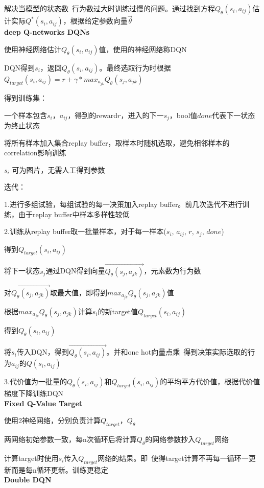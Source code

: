 \documentclass[UTF8]{ctexart}
\begin{document}
  解决当模型的状态数\ 行为数过大时训练过慢的问题。通过找到方程$Q_{\theta}(s_i, a_{ij})$估计实际$Q^*(s_i, a_{ij})$，根据给定参数向量$\vec{\theta}$\\
\textbf{deep Q-networks DQNs}

  使用神经网络估计$Q_{\theta}(s_i, a_{ij})$值，使用的神经网络称DQN
  
  DQN得到$s_i$，返回$Q_{\theta}(s_i, a_{ij})$。最终选取行为时根据$Q_{target}(s_i, a_{ij}) = r + \gamma * max_{a_{jk}} Q_{\theta}(s_j, a_{jk})$

  得到训练集：

  \quad 一个样本包含$s_i$，$a_{ij}$，得到的reward$r$，进入的下一$s_j$，bool值$done$代表下一状态为终止状态

  \quad 将所有样本加入集合replay buffer，取样本时随机选取，避免相邻样本的correlation影响训练

  \quad $s_i$ 可为图片，无需人工得到参数
  
  迭代：
  
  \quad 1.进行多组试验，每组试验的每一决策加入replay buffer。前几次迭代不进行训练，由于replay buffer中样本多样性较低
  
  \quad 2.训练从replay buffer取一批量样本，对于每一样本($s_i$, $a_{ij}$, $r$, $s_j$, $done$)

  \quad \quad 得到$Q_{target}(s_i, a_{ij})$
  
  \quad \quad \quad 将下一状态$s_j$通过DQN得到向量$\vec{Q_{\theta}(s_j, a_{jk})}$，元素数为行为数

  \quad \quad \quad 对$\vec{Q_{\theta}(s_j, a_{jk})}$取最大值，即得到$max_{a_{jk}} Q_{\theta}(s_j, a_{jk})$值

  \quad \quad \quad 根据$max_{a_{jk}} Q_{\theta}(s_j, a_{jk})$计算$s_i$的新target值$Q_{target}(s_i, a_{ij})$

  \quad \quad 得到$Q_{\theta}(s_i, a_{ij})$

  \quad \quad \quad 将$s_i$传入DQN，得到$\vec{Q_{\theta}(s_i, a_{ij})}$。并和one hot向量点乘\ 得到决策实际选取的行为$a_{ij}$的$Q(s_i, a_{ij})$

  \quad 3.代价值为一批量的$Q_{\theta}(s_i, a_{ij})$和$Q_{target}(s_i, a_{ij})$的平均平方代价值，根据代价值梯度下降训练DQN\\
\textbf{Fixed Q-Value Target}

  使用2神经网络，分别负责计算$Q_{target}$，$Q_{\theta}$

  两网络初始参数一致，每n次循环后将计算$Q_{\theta}$的网络参数抄入$Q_{target}$网络

  计算target时使用$s_i$传入$Q_{target}$网络的结果。即\ 使得target计算不再每一循环一更新而是每n循环更新。训练更稳定\\
\textbf{Double DQN} 
\end{document}
